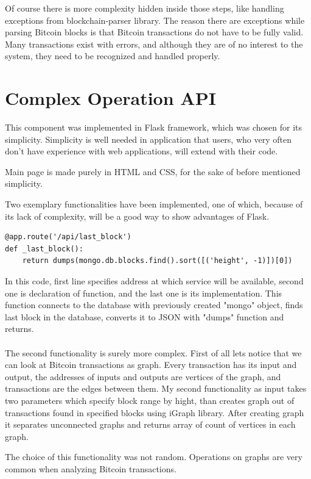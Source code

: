 \documentclass[12pt, en, eng, oneside, final]{mgr}
\begin{document}
Of course there is more complexity hidden inside those steps, like handling exceptions from blockchain-parser library. The reason there are exceptions while parsing Bitcoin blocks is that Bitcoin transactions do not have to be fully valid. Many transactions exist with errors, and although they are of no interest to the system, they need to be recognized and handled properly.

\section{Complex Operation API}
This component was implemented in Flask framework\cite{flask-web-page}, which was chosen for its simplicity. Simplicity is well needed in application that users, who very often don't have experience with web applications, will extend with their code. 

Main page is made purely in HTML and CSS, for the sake of before mentioned simplicity.

Two exemplary functionalities have been implemented, one of which, because of its lack of complexity, will be a good way to show advantages of Flask.
\begin{verbatim}
@app.route('/api/last_block')
def _last_block():
    return dumps(mongo.db.blocks.find().sort([('height', -1)])[0])
\end{verbatim}
In this code, first line specifies address at which service will be available, second one is declaration of function, and the last one is its implementation. This function connects to the database with previously created "mongo" object, finds last block in the database, converts it to JSON with "dumps" function and returns.
\\
\\
The second functionality is surely more complex. First of all lets notice that we can look at Bitcoin transactions as graph. Every transaction has its input and output, the addresses of inputs and outputs are vertices of the graph, and transactions are the edges between them. My second functionality as input takes two parameters which specify block range by hight, than creates graph out of transactions found in specified blocks using iGraph\cite{igraph} library. After creating graph it separates unconnected graphs and returns array of count of vertices in each graph.

The choice of this functionality was not random. Operations on graphs are very common when analyzing Bitcoin transactions.
\end{document}
